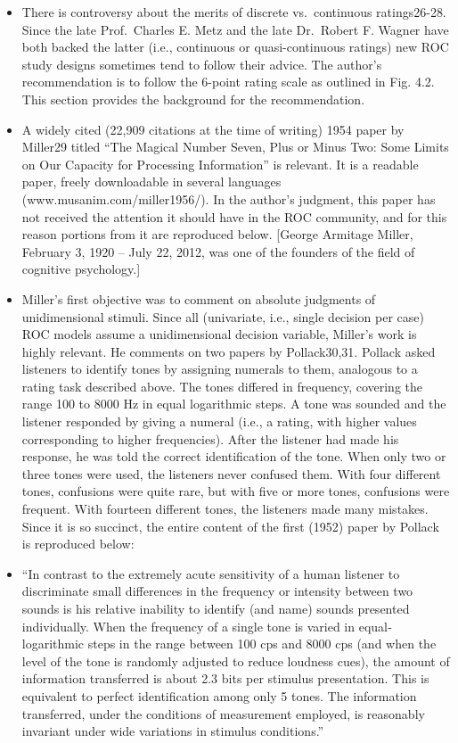\documentclass[
]{book}
\begin{document}
\begin{itemize}
\item
  There is controversy about the merits of discrete vs.~continuous ratings26-28. Since the late Prof.~Charles E. Metz and the late Dr.~Robert F. Wagner have both backed the latter (i.e., continuous or quasi-continuous ratings) new ROC study designs sometimes tend to follow their advice. The author's recommendation is to follow the 6-point rating scale as outlined in Fig. 4.2. This section provides the background for the recommendation.
\item
  A widely cited (22,909 citations at the time of writing) 1954 paper by Miller29 titled ``The Magical Number Seven, Plus or Minus Two: Some Limits on Our Capacity for Processing Information'' is relevant. It is a readable paper, freely downloadable in several languages (www.musanim.com/miller1956/). In the author's judgment, this paper has not received the attention it should have in the ROC community, and for this reason portions from it are reproduced below. {[}George Armitage Miller, February 3, 1920 -- July 22, 2012, was one of the founders of the field of cognitive psychology.{]}
\item
  Miller's first objective was to comment on absolute judgments of unidimensional stimuli. Since all (univariate, i.e., single decision per case) ROC models assume a unidimensional decision variable, Miller's work is highly relevant. He comments on two papers by Pollack30,31. Pollack asked listeners to identify tones by assigning numerals to them, analogous to a rating task described above. The tones differed in frequency, covering the range 100 to 8000 Hz in equal logarithmic steps. A tone was sounded and the listener responded by giving a numeral (i.e., a rating, with higher values corresponding to higher frequencies). After the listener had made his response, he was told the correct identification of the tone. When only two or three tones were used, the listeners never confused them. With four different tones, confusions were quite rare, but with five or more tones, confusions were frequent. With fourteen different tones, the listeners made many mistakes. Since it is so succinct, the entire content of the first (1952) paper by Pollack is reproduced below:
\item
  ``In contrast to the extremely acute sensitivity of a human listener to discriminate small differences in the frequency or intensity between two sounds is his relative inability to identify (and name) sounds presented individually. When the frequency of a single tone is varied in equal‐logarithmic steps in the range between 100 cps and 8000 cps (and when the level of the tone is randomly adjusted to reduce loudness cues), the amount of information transferred is about 2.3 bits per stimulus presentation. This is equivalent to perfect identification among only 5 tones. The information transferred, under the conditions of measurement employed, is reasonably invariant under wide variations in stimulus conditions.''

\end{itemize}
\end{document}
